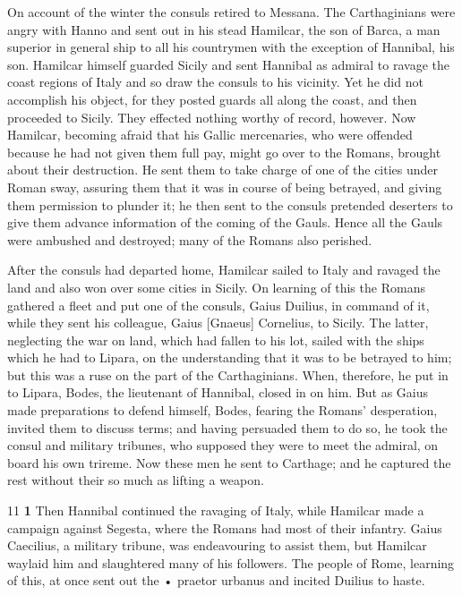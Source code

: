On account of the winter the consuls retired to Messana. The Carthaginians were angry with Hanno and sent out in his stead Hamilcar, the son of Barca, a man superior in general ­ship to all his countrymen with the exception of Hannibal, his son. Hamilcar himself guarded Sicily and sent Hannibal as admiral to ravage the coast regions of Italy and so draw the consuls to his vicinity. Yet he did not accomplish his object, for they posted guards all along the coast, and then proceeded to Sicily. They effected nothing worthy of record, however. Now Hamilcar, becoming afraid that his Gallic mercenaries, who were offended because he had not given them full pay, might go over to the Romans, brought about their destruction. He sent them to take charge of one of the cities under Roman sway, assuring them that it was in course of being betrayed, and giving them permission to plunder it; he then sent to the consuls pretended deserters to give them advance information of the coming of the Gauls. Hence all the Gauls were ambushed and destroyed; many of the Romans also perished.

After the consuls had departed home, Hamilcar sailed to Italy and ravaged the land and also won over some cities in Sicily. On learning of this the Romans gathered a fleet and put one of the consuls, Gaius Duilius, in command of it, while they sent his colleague, Gaius [Gnaeus] Cornelius, to Sicily. The latter, neglecting the war on land, which had fallen to his lot, sailed with the ships which he had to Lipara, on the understanding that it was to be betrayed to him; but this was a ruse on the part of the Carthaginians. When, therefore, he put in to Lipara, Bodes, the lieutenant of Hannibal, closed in on him. But as Gaius made preparations to defend himself, Bodes, fearing the Romans' desperation, invited them to discuss terms; and having persuaded them to do so, he took the consul and military tribunes, who supposed they were to meet the admiral, on board his own trireme. Now these men he sent to Carthage; and he captured the rest without their so much as lifting a weapon.

11
\textbf{1} Then Hannibal continued the ravaging of Italy, while Hamilcar made a campaign against Segesta, where the Romans had most of their infantry. Gaius Caecilius, a military tribune, was endeavouring to assist them, but Hamilcar waylaid him and slaughtered many of his followers. The people of Rome, learning of this, at once sent out the
\texthebrew{•} praetor urbanus and incited Duilius to haste.

